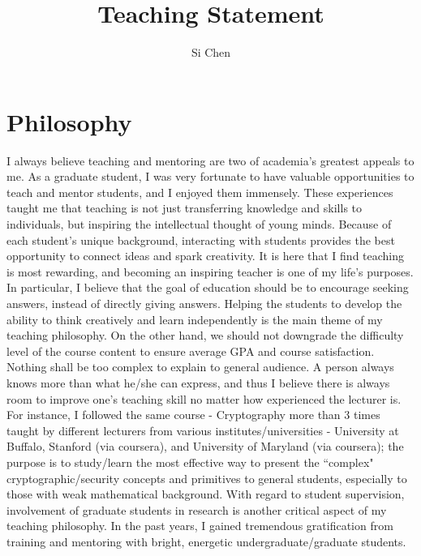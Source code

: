 \documentclass[11pt]{article}
\begin{document}
\title{Teaching Statement}
\author{Si Chen}
\date{}
\maketitle

\section*{Philosophy} 

I always believe teaching and mentoring are two of academia's greatest appeals to me. As a graduate student, I was very fortunate to have valuable opportunities to teach and mentor students, and I enjoyed them immensely. These experiences taught me that teaching is not just transferring knowledge and skills to individuals, but inspiring the intellectual thought of young minds. Because of each student's unique background, interacting with students provides the best opportunity to connect ideas and spark creativity. It is here that I find teaching is most rewarding, and becoming an inspiring teacher is one of my life's purposes. In particular, I believe that the goal of education should be to encourage seeking answers, instead of directly giving answers. Helping the students to develop the ability to think creatively and learn independently is the main theme of my teaching philosophy. On the other hand, we should not downgrade the difficulty level of the course content to ensure average GPA and course satisfaction. Nothing shall be too complex to explain to general audience. A person always knows more than what he/she can express, and thus I believe there is always room to improve one's teaching skill no matter how experienced the lecturer is. For instance, I followed the same course - Cryptography more than 3 times taught by different lecturers from various institutes/universities - University at Buffalo, Stanford (via coursera), and University of Maryland (via coursera); the purpose is to study/learn the most effective way to present the ``complex" cryptographic/security concepts and primitives to general students, especially to those with weak mathematical background. With regard to student supervision, involvement of graduate students in research is another critical aspect of my teaching philosophy. In the past years, I gained tremendous gratification from training and mentoring with bright, energetic undergraduate/graduate students. 
\end{document}
